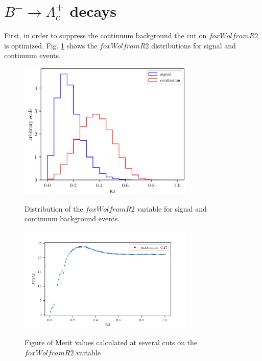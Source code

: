 
\section{$B^- \rightarrow \Lambda_c^+$ decays}
\label{sec:chargedCorrBtoLambdaC}


First, in order to suppress the continuum background the cut on $foxWolframR2$ is optimized. Fig. \ref{fig:R2distributions} shows the $foxWolframR2$ distributions for signal and continuum events. 
\begin{figure}[h!]
{\includegraphics[width=0.75\textwidth]{04-chargedCorrBtoLambda/figs/R2EventLevel_sig_qqbar_distributions.png}}
\caption{Distribution of the $foxWolframR2$ variable for signal and continuum background events.}
\label{fig:R2distributions}
\end{figure}


\begin{figure}[h!]
{\includegraphics[width=0.75\textwidth]{04-chargedCorrBtoLambda/figs/corr_chargedB_FOMvsR2_cut.png}}
\caption{Figure of Merit values calculated at several cuts on the $foxWolframR2$ variable}
\label{fig:corr_chargedB_FOMvsR2_cut}
\end{figure}

